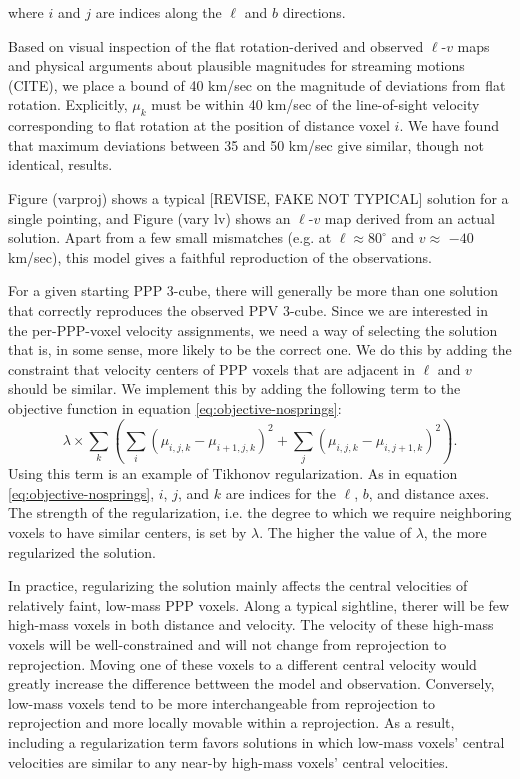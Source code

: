 where $i$ and $j$ are indices along the $\ell$ and $b$ directions. 

Based on visual inspection of the flat rotation-derived and observed $\ell$-$v$ maps and physical arguments about plausible magnitudes for streaming motions (CITE), we place a bound of 40 km/sec on the magnitude of deviations from flat rotation. Explicitly, $\mu_k$ must be within 40 km/sec of the line-of-sight velocity corresponding to flat rotation at the position of distance voxel $i$. We have found that maximum deviations between 35 and 50 km/sec give similar, though not identical, results.

Figure (varproj) shows a typical [REVISE, FAKE NOT TYPICAL] solution for a single pointing, and Figure (vary lv) shows an $\ell$-$v$ map derived from an actual solution. Apart from a few small mismatches (e.g. at $\ell \approx 80^\circ$ and $v\approx$ $-40$ km/sec), this model gives a faithful reproduction of the observations.

For a given starting PPP 3-cube, there will generally be more than one solution that correctly reproduces the observed PPV 3-cube. Since we are interested in the per-PPP-voxel velocity assignments, we need a way of selecting the solution that is, in some sense, more likely to be the correct one. We do this by adding the constraint that velocity centers of PPP voxels that are adjacent in $\ell$ and $v$ should be similar. We implement this by adding the following term to the objective function in equation \ref{eq:objective-nosprings}:
\begin{equation}
    \lambda \times \sum_k \left( \sum_i (\mu_{i,j,k} - \mu_{i+1,j,k})^2 + 
    \sum_j (\mu_{i,j,k} - \mu_{i,j+1,k})^2 \right).
\end{equation}
Using this term is an example of Tikhonov regularization. As in equation \ref{eq:objective-nosprings}, $i$, $j$, and $k$ are indices for the $\ell$, $b$, and distance axes. The strength of the regularization, i.e. the degree to which we require neighboring voxels to have similar centers, is set by $\lambda$. The higher the value of $\lambda$, the more regularized the solution.

In practice, regularizing the solution mainly affects the central velocities of relatively faint, low-mass PPP voxels. Along a typical sightline, therer will be few high-mass voxels in both distance and velocity. The velocity of these high-mass voxels will be well-constrained and will not change from reprojection to reprojection. Moving one of these voxels to a different central velocity would greatly increase the difference bettween the model and observation. Conversely, low-mass voxels tend to be more interchangeable from reprojection to reprojection and more locally movable within a reprojection. As a result, including a regularization term favors solutions in which low-mass voxels' central velocities are similar to any near-by high-mass voxels' central velocities.

